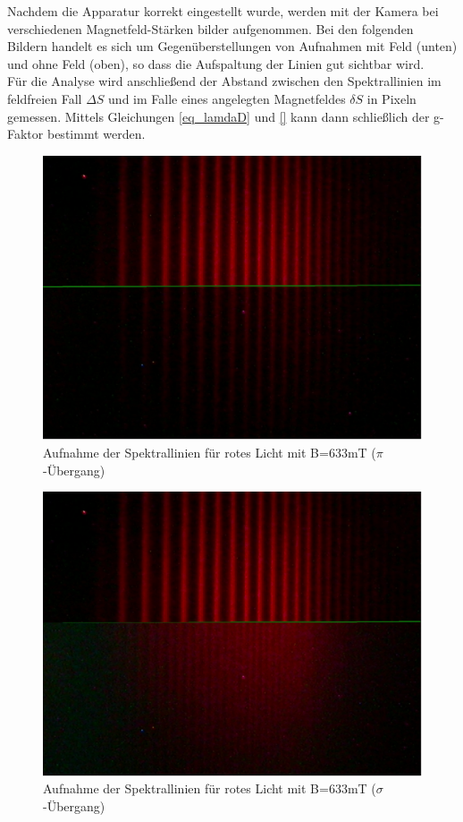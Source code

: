 Nachdem die Apparatur korrekt eingestellt wurde, werden mit der Kamera bei verschiedenen Magnetfeld-Stärken bilder aufgenommen. Bei den folgenden Bildern handelt es sich um Gegenüberstellungen von Aufnahmen mit Feld (unten) und ohne Feld (oben), so dass die Aufspaltung der Linien gut sichtbar wird.\\
Für die Analyse wird anschließend der Abstand zwischen den Spektrallinien im feldfreien Fall $\Delta S$ und im Falle eines angelegten Magnetfeldes $\delta S$ in Pixeln gemessen. Mittels Gleichungen \eqref{eq_lamdaD} und \eqref{} kann dann schließlich der g-Faktor bestimmt werden.
\newpage
\begin{figure}[htbp]
\includegraphics[scale=.5]{../pics/red1.pdf}
\caption{Aufnahme der Spektrallinien für rotes Licht mit B=633mT ($\pi$-Übergang)}
\label{pic_red1}
\end{figure}
\begin{figure}[htbp]
\includegraphics[scale=.5]{../pics/red2.pdf}
\caption{Aufnahme der Spektrallinien für rotes Licht mit B=633mT ($\sigma$-Übergang)}
\label{pic_red2}
\end{figure}
